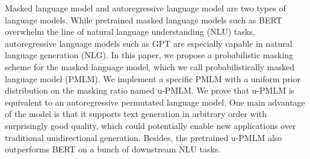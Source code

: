 Masked language model and autoregressive language model are two types of language models. While pretrained masked language models such as BERT overwhelm the line of natural language understanding (NLU) tasks, autoregressive language models such as GPT are especially capable in natural language generation (NLG). In this paper, we propose a probabilistic masking scheme for the masked language model, which we call probabilistically masked language model (PMLM). We implement a specific PMLM with a uniform prior distribution on the masking ratio named u-PMLM. We prove that u-PMLM is equivalent to an autoregressive permutated language model. One main advantage of the model is that it supports text generation in arbitrary order with surprisingly good quality, which could potentially enable new applications over traditional unidirectional generation. Besides, the pretrained u-PMLM also outperforms BERT on a bunch of downstream NLU tasks.

